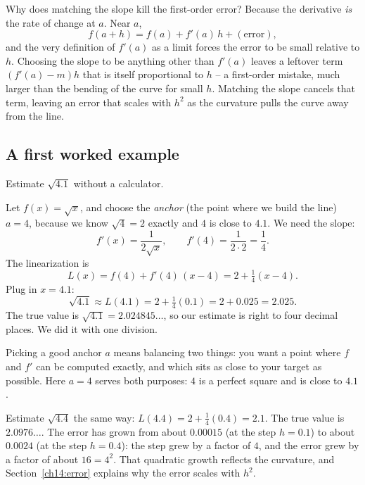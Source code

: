 \begin{whybox}
Why does matching the slope kill the first-order error? Because the derivative
\emph{is} the rate of change at $a$. Near $a$,
\[
f(a+h) = f(a) + f'(a)\,h + (\text{error}),
\]
and the very definition of $f'(a)$ as a limit forces the error to be small
relative to $h$. Choosing the slope to be anything other than $f'(a)$ leaves a
leftover term $(f'(a)-m)h$ that is itself proportional to $h$ -- a first-order
mistake, much larger than the bending of the curve for small $h$. Matching the
slope cancels that term, leaving an error
that scales with $h^2$ as the curvature pulls the curve away from the line.
\end{whybox}

\subsection{A first worked example}

\begin{example}
\label{ch14:ex-sqrt}
Estimate $\sqrt{4.1}$ without a calculator.

Let $f(x)=\sqrt{x}$, and choose the \emph{anchor} (the point where we build the
line) $a=4$, because we know
$\sqrt{4}=2$ exactly and $4$ is close to $4.1$. We need the slope:
\[
f'(x) = \frac{1}{2\sqrt{x}}, \qquad f'(4) = \frac{1}{2\cdot 2} = \frac14.
\]
The linearization is
\[
L(x) = f(4) + f'(4)\,(x-4) = 2 + \tfrac14 (x-4).
\]
Plug in $x=4.1$:
\[
\sqrt{4.1} \approx L(4.1) = 2 + \tfrac14 (0.1) = 2 + 0.025 = 2.025.
\]
The true value is $\sqrt{4.1} = 2.024845\ldots$, so our estimate is right to four
decimal places. We did it with one division.
\end{example}

Picking a good anchor $a$ means balancing two things: you want a point where $f$ and $f'$
can be computed exactly, and which sits as close to your target as possible.
Here $a=4$ serves both purposes: $4$ is a perfect square and is close to $4.1$.

\begin{labbox}
Estimate $\sqrt{4.4}$ the same way: $L(4.4) = 2 + \tfrac14(0.4) = 2.1$. The true
value is $2.0976\ldots$. The error has grown from about $0.00015$ (at the
step $h=0.1$) to about $0.0024$ (at the step $h=0.4$): the step grew by a factor
of $4$, and the error grew by a factor of about $16=4^2$. That quadratic growth
reflects the curvature, and Section~\ref{ch14:error} explains
why the error scales with $h^2$.
\end{labbox}

